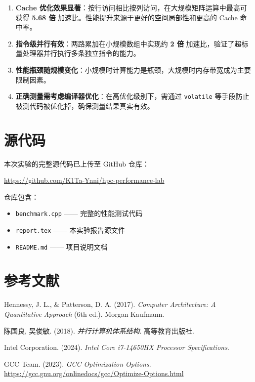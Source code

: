 \documentclass[11pt,a4paper]{article}
\begin{document}
\begin{enumerate}
    \item \textbf{Cache 优化效果显著}：按行访问相比按列访问，在大规模矩阵运算中最高可获得 \textbf{5.68 倍} 加速比。性能提升来源于更好的空间局部性和更高的 Cache 命中率。
    \item \textbf{指令级并行有效}：两路累加在小规模数组中实现约 \textbf{2 倍} 加速比，验证了超标量处理器并行执行多条独立指令的能力。
    \item \textbf{性能瓶颈随规模变化}：小规模时计算能力是瓶颈，大规模时内存带宽成为主要限制因素。
    \item \textbf{正确测量需考虑编译器优化}：在高优化级别下，需通过 \texttt{volatile} 等手段防止被测代码被优化掉，确保测量结果真实有效。
\end{enumerate}

\section{源代码}

本次实验的完整源代码已上传至 GitHub 仓库：
\begin{center}
\url{https://github.com/K1Ta-Ynni/hpc-performance-lab}
\end{center}

仓库包含：
\begin{itemize}
    \item \texttt{benchmark.cpp} —— 完整的性能测试代码
    \item \texttt{report.tex} —— 本实验报告源文件
    \item \texttt{README.md} —— 项目说明文档
\end{itemize}

\section*{参考文献}

\begin{enumerate}[label={[1]}]
    \item Hennessy, J. L., \& Patterson, D. A. (2017). \textit{Computer Architecture: A Quantitative Approach} (6th ed.). Morgan Kaufmann.
    \item 陈国良, 吴俊敏. (2018). \textit{并行计算机体系结构}. 高等教育出版社.
    \item Intel Corporation. (2024). \textit{Intel Core i7-14650HX Processor Specifications}.
    \item GCC Team. (2023). \textit{GCC Optimization Options}. \url{https://gcc.gnu.org/onlinedocs/gcc/Optimize-Options.html}
\end{enumerate}
\end{document}
